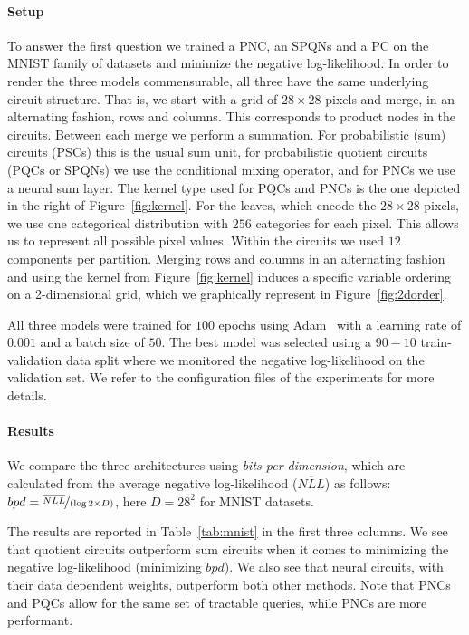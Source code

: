 \documentclass[letterpaper]{article} %
\begin{document}
\paragraph*{Setup}
To answer the first question we trained a PNC, an SPQNs and a PC on the MNIST family of datasets and minimize the negative log-likelihood. In order to render the three models commensurable, all three have the same underlying circuit structure. That is, we start with a grid of $28\times 28$ pixels and merge, in an alternating fashion, rows and columns. This corresponds to product nodes in the circuits. Between each merge we perform a summation. For probabilistic (sum) circuits (PSCs) this is the usual sum unit, for probabilistic quotient circuits (PQCs or SPQNs) we use the conditional mixing operator, and for PNCs we use a neural sum layer. The kernel type used for PQCs and PNCs is the one depicted in the right of Figure~\ref{fig:kernel}.
For the leaves, which encode the $28\times 28$ pixels, we use one categorical distribution with $256$ categories for each pixel. This allows us to represent all possible pixel values.
Within the circuits we used $12$ components per partition.
Merging rows and columns in an alternating fashion and using the kernel from Figure~\ref{fig:kernel} induces a specific variable ordering on a 2-dimensional grid, which we graphically represent in Figure~\ref{fig:2dorder}.

All three models were trained for $100$ epochs using Adam~\citep{kingma2014adam} with a learning rate of $0.001$ and a batch size of $50$.
The best model was selected using a $90-10$ train-validation data split where we monitored the negative log-likelihood on the validation set. We refer to the configuration files of the experiments for more details.




\paragraph*{Results}
We compare the three architectures using \textit{bits per dimension}, which are calculated from the average negative log-likelihood ($\overline{NLL}$) as follows: $bpd = \nicefrac{\overline{NLL}}{(\log{2} \times D)}$, here $D=28^2$ for MNIST datasets.

The results are reported in Table~\ref{tab:mnist} in the first three columns. We see that quotient circuits outperform sum circuits when it comes to minimizing the negative log-likelihood (minimizing $bpd$). We also see that neural circuits, with their data dependent weights, outperform both other methods. Note that PNCs and PQCs allow for the same set of tractable queries, while PNCs are more performant.
\end{document}
